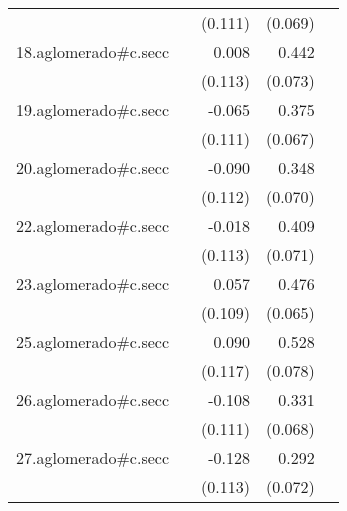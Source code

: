 {\begin{longtable}{l*{4}{D{.}{.}{-1}}}
            &                     &     (0.111)         &     (0.069)         &                     \\
\addlinespace
18.aglomerado#c.secc&                     &       0.008         &       0.442\sym{***}&                     \\
            &                     &     (0.113)         &     (0.073)         &                     \\
\addlinespace
19.aglomerado#c.secc&                     &      -0.065         &       0.375\sym{***}&                     \\
            &                     &     (0.111)         &     (0.067)         &                     \\
\addlinespace
20.aglomerado#c.secc&                     &      -0.090         &       0.348\sym{***}&                     \\
            &                     &     (0.112)         &     (0.070)         &                     \\
\addlinespace
22.aglomerado#c.secc&                     &      -0.018         &       0.409\sym{***}&                     \\
            &                     &     (0.113)         &     (0.071)         &                     \\
\addlinespace
23.aglomerado#c.secc&                     &       0.057         &       0.476\sym{***}&                     \\
            &                     &     (0.109)         &     (0.065)         &                     \\
\addlinespace
25.aglomerado#c.secc&                     &       0.090         &       0.528\sym{***}&                     \\
            &                     &     (0.117)         &     (0.078)         &                     \\
\addlinespace
26.aglomerado#c.secc&                     &      -0.108         &       0.331\sym{***}&                     \\
            &                     &     (0.111)         &     (0.068)         &                     \\
\addlinespace
27.aglomerado#c.secc&                     &      -0.128         &       0.292\sym{***}&                     \\
            &                     &     (0.113)         &     (0.072)         &                     \\

\end{longtable}}
